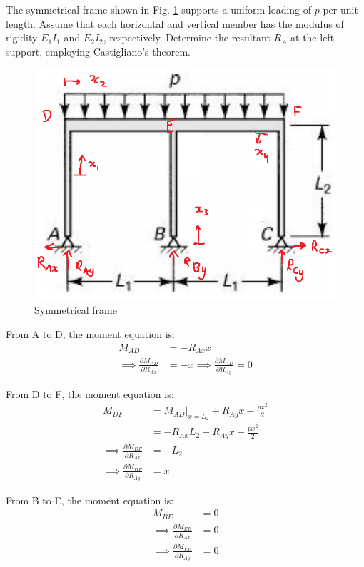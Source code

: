 \section{}
The symmetrical frame shown in Fig. \ref{fig:Q5} supports a uniform loading of $p$ per unit length. Assume that each horizontal and vertical
member has the modulus of rigidity $E_1 I_1$ and $E_2 I_2$, respectively. Determine the resultant $R_A$ at the left support, employing
Castigliano's theorem.

\begin{figure}[h]
    \centering
    \includegraphics[width=0.5\linewidth]{Questions/Figures/Q5ProblemDiagram.png}
    \caption{Symmetrical frame}
    \label{fig:Q5}
\end{figure}

From A to D, the moment equation is:
\begin{align*}
    M_{AD} &= - R_{Ax} x \\
    \implies \frac{\partial M_{AD}}{\partial R_{Ax}} &= -x
    \implies \frac{\partial M_{AD}}{\partial R_{Ay}} = 0
\end{align*}

From D to F, the moment equation is:
\begin{align*}
    M_{DF} &= M_{AD}|_{x=L_2} + R_{Ay}x - \frac{px^2}{2} \\
    &= -R_{Ax}L_2 + R_{Ay}x - \frac{px^2}{2} \\
    \implies \frac{\partial M_{DF}}{\partial R_{Ax}} &= -L_2 \\
    \implies \frac{\partial M_{DF}}{\partial R_{Ay}} &= x
\end{align*}

From B to E, the moment equation is:
\begin{align*}
    M_{BE} &= 0 \\
    \implies \frac{\partial M_{EB}}{\partial R_{Ax}} &= 0 \\
    \implies \frac{\partial M_{EB}}{\partial R_{Ay}} &= 0
\end{align*}

